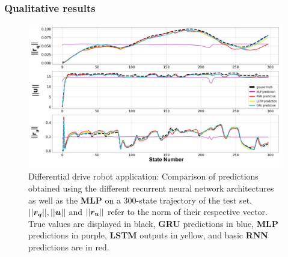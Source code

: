 \subsubsection{Qualitative results}

\begin{figure}[h!]
    \centering
    \includegraphics[width=0.99\linewidth]{figures/learning_unic/all_models_labeled.jpg} 
    \caption{Differential drive robot application: Comparison of predictions obtained using the different recurrent neural network architectures as well as the \textbf{MLP} on a 300-state trajectory of the test set. 
    $||\boldsymbol{r_q}||, ||\boldsymbol{u}||$ and $||\boldsymbol{r_u}||$ refer to the norm of their respective vector. 
    True values are displayed in black, \textbf{GRU} predictions in blue, \textbf{MLP} predictions in purple, \textbf{LSTM} outputs in yellow, and basic \textbf{RNN} predictions are in red.}
    \label{fig:all_models_pred_val_unic}
\end{figure}

